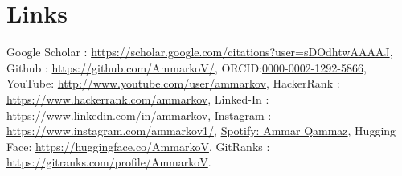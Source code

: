\documentclass[a4,8pt]{article}
\begin{document}
\section{Links}
\linespread{0.6} 
\vspace{-0.2cm} 
Google Scholar : \href{https://scholar.google.com/citations?user=sDOdhtwAAAAJ}{https://scholar.google.com/citations?user=sDOdhtwAAAAJ}, Github : \href{https://github.com/AmmarkoV/}{https://github.com/AmmarkoV/}, ORCID:\href{https://orcid.org/0000-0002-1292-5866}{0000-0002-1292-5866}, YouTube: \href{http://www.youtube.com/user/ammarkov}{http://www.youtube.com/user/ammarkov}, HackerRank : \href{https://www.hackerrank.com/ammarkov}{https://www.hackerrank.com/ammarkov}, Linked-In : \href{https://www.linkedin.com/in/ammarkov}{https://www.linkedin.com/in/ammarkov}, Instagram : \href{https://www.instagram.com/ammarkov1/}{https://www.instagram.com/ammarkov1/}, \href{https://open.spotify.com/user/312mcszdrjonbv4wgzzd5ndcmsim?si=dd06aeb4af604bdd}{Spotify: Ammar Qammaz}, Hugging Face: \href{https://huggingface.co/AmmarkoV}{https://huggingface.co/AmmarkoV}, GitRanks : \href{https://gitranks.com/profile/AmmarkoV}{https://gitranks.com/profile/AmmarkoV}.
\linespread{0.82} 
\end{document}
